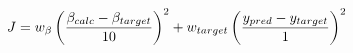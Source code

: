 \documentclass[preview]{standalone}
\begin{document}
\begin{align*}
\special{dvisvgm:raw <g id='unique000'>}J = w_{\beta} \left( \frac{\beta_{calc} - \beta_{target}}{10} \right)^2 + w_{target} \left( \frac{y_{pred} - y_{target}}{1} \right)^2\special{dvisvgm:raw </g>}
\end{align*}
\end{document}
